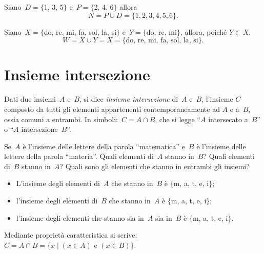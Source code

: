 \begin{exrig}
 \begin{esempio}
Siano~$D=\{$1, 3, 5$\}$ e~$P=\{$2, 4, 6$\}$ allora \[N=P\cup D=\{1, 2, 3, 4, 5, 6\}.\]
\begin{center}
 
\end{center}
\end{esempio}

\begin{esempio}
Siano~$X=\{$do, re, mi, fa, sol, la, si$\}$
e~$Y=\{$do, re, mi$\}$, allora, poiché $Y\subset X$, \[W=X\cup Y=X=\{\text{do, re, mi, fa, sol, la, si}\}.\]
\begin{center}
 
\end{center}
\end{esempio}
\end{exrig}

\ovalbox{\risolvii \ref{ese:5.52}, \ref{ese:5.53}, \ref{ese:5.54}, \ref{ese:5.55}}

\section{Insieme intersezione}

\begin{definizione}
Dati due insiemi~$A$ e~$B$, si dice \emph{insieme intersezione} di~$A$ e~$B$, l'insieme
$C$ composto da tutti gli elementi appartenenti contemporaneamente ad
$A$ e a~$B$, ossia comuni a entrambi.
In simboli:~$C=A\cap B$, che si legge
``$A$ intersecato a~$B$'' o ``$A$ intersezione~$B$''.
\end{definizione}

\begin{exrig}
 \begin{esempio}
Se~$A$ è l'insieme delle lettere della parola ``matematica'' e~$B$ è l'insieme delle lettere della parola
``materia''. Quali elementi di~$A$ stanno in~$B$? Quali elementi di~$B$ stanno in~$A$? Quali sono gli elementi
che stanno in entrambi gli insiemi?
\begin{itemize}
 \item L'insieme degli elementi di~$A$ che stanno in~$B$ è $\{$m, a, t, e, i$\}$;
 \item l'insieme degli elementi di~$B$ che stanno in~$A$ è $\{$m, a, t, e, i$\}$;
 \item l'insieme degli elementi che stanno sia in~$A$ sia in~$B$ è $\{$m, a, t, e, i$\}$.
\end{itemize}
\end{esempio}
\end{exrig}
\begin{center}
 
\end{center}
Mediante proprietà caratteristica si scrive:~$C=A\cap B=\{x\mid (x\in A)\text{ e }(x\in B)\}$.

